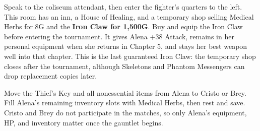 \documentclass[
  american,
  10pt,
  letterpaper,
  oneside,
  open=any]{scrreprt}
\newcounter{none} %
\begin{document}
Speak to the coliseum attendant, then enter the fighter's quarters to
the left. This room has an inn, a House of Healing, and a temporary shop
selling Medical Herbs for 8G and the \textbf{Iron Claw for 1,500G}. Buy
and equip the Iron Claw before entering the tournament. It gives Alena
+38 Attack, remains in her personal equipment when she returns in
Chapter 5, and stays her best weapon well into that chapter. This is the
last guaranteed Iron Claw: the temporary shop closes after the
tournament, although Skeletons and Phantom Messengers can drop
replacement copies later.

Move the Thief's Key and all nonessential items from Alena to Cristo or
Brey. Fill Alena's remaining inventory slots with Medical Herbs, then
rest and save. Cristo and Brey do not participate in the matches, so
only Alena's equipment, HP, and inventory matter once the gauntlet
begins.
\end{document}
